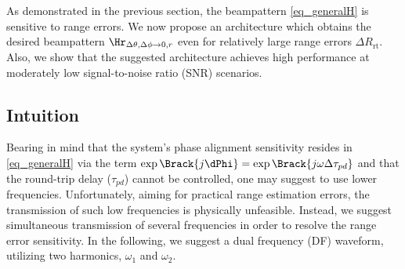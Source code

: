 As demonstrated in the previous section, the beampattern \eqref{eq_generalH} is sensitive to range errors.
We now propose an architecture which obtains the desired beampattern $\Hr_{\Delta\theta,\Delta\phi\to0,r}$ even for relatively large range errors $\Delta R_{\text{rt}}$. Also, we show that the suggested architecture achieves high performance at moderately low signal-to-noise ratio (SNR) scenarios.

\subsection*{Intuition}
Bearing in mind that the system's phase alignment sensitivity resides in \eqref{eq_generalH} via the  term $\exp\Brack{j\dPhi}=\exp\Brack{j\omega\Delta\tau_{pd}}$ and that the round-trip delay ($\tau_{pd}$) cannot be controlled, one may suggest to use lower frequencies. 
Unfortunately, aiming for practical range estimation errors, the transmission of such low frequencies is physically unfeasible. 
Instead, we suggest simultaneous transmission of several frequencies in order to resolve the range error sensitivity. In the following, we suggest a dual frequency (DF) waveform, utilizing two harmonics, $\omega_1$ and $\omega_2$.

